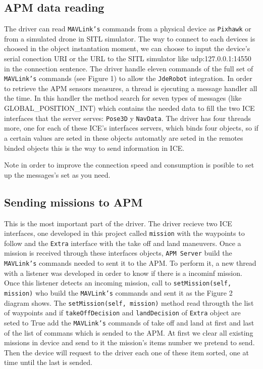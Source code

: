 \documentclass{llncs}
\begin{document}
\subsection{APM data reading}
\label{subsec:apm_data_reading}

The driver can read \texttt{MAVLink's} commands from a physical device as \texttt{Pixhawk} or from a simulated drone in SITL simulator. The way to connect to each devices is choosed in the object instantation moment, we can choose to input the device's serial conection URI or the URL to the SITL simulator like udp:127.0.0.1:14550 in the connection sentence.
The driver handle eleven commands of the full set of \texttt{MAVLink's} commands (see Figure 1) to allow the \texttt{JdeRobot} integration. 
In order to retrieve the APM sensors measures, a thread is ejecuting a message handler all the time.
In this handler the method search for seven types of messages (like GLOBAL\_POSITION\_INT) which contains the needed data to fill the two ICE interfaces that the server serves: \texttt{Pose3D} y \texttt{NavData}.
The driver has four threads more, one for each of these ICE's interfaces servers, which binds four objects, so if a certain values are seted in these objects automatly are seted in the remotes binded objects this is the way to send information in ICE. 


Note in order to improve the connection speed and consumption is posible to set up the messages's set as you need.


\subsection{Sending missions to APM}
\label{sec:mission_apm}

This is the most important part of the driver. The driver recieve two ICE interfaces, one developed in this project called \texttt{mission} with the waypoints to follow and the \texttt{Extra} interface with the take off and land maneuvers.
Once a mission is received through these interfaces objects, \texttt{APM Server} build the \texttt{MAVLink's} commands needed to sent it to the APM. To perform it, a new thread with a listener was developed in order to know if there is a incominf mission.
Once this listener detects an incoming mission, call to \texttt{setMission(self, mission)} who build the \texttt{MAVLink's} commands and sent it as the Figure 2 diagram shows.
The \texttt{setMission(self, mission)} method read througth the list of waypoints and if \texttt{takeOffDecision} and \texttt{landDecision} of \texttt{Extra} object are seted to True add the \texttt{MAVLink's} commands of take off and land at first and last of the list of commans which is sended to the APM.
At first we clear all existing missions in device and send to it the mission's items number we pretend to send. Then the device will request to the driver each one of these item sorted, one at time until the last is sended. 
\end{document}
